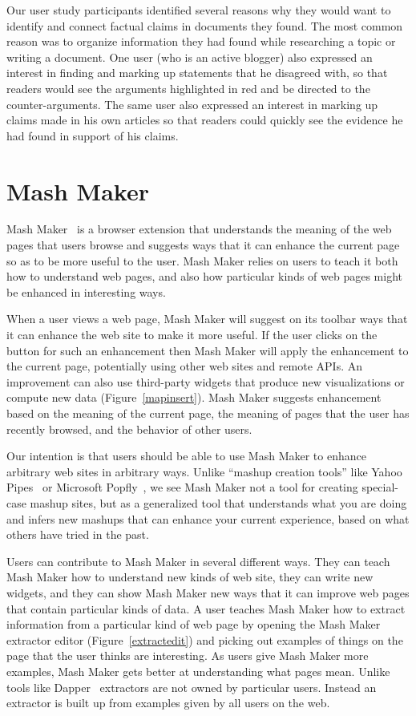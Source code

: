 \documentclass{chi2009}
\begin{document}
Our user study participants identified several reasons why they would want to identify and connect factual claims in documents they found. The most common reason was to organize information they had found while researching a topic or writing a document. One user (who is an active blogger) also expressed an interest in finding and marking up statements that he disagreed with, so that readers would see the arguments highlighted in red and be directed to the counter-arguments. The same user also expressed an interest in marking up claims made in his own articles so that readers could quickly see the evidence he had found in support of his claims. 


\section{Mash Maker}

Mash Maker~\cite{mashmaker} is a browser extension that understands the meaning of the web pages that users browse and suggests ways that it can enhance the current page so as to be more useful to the user. Mash Maker relies on users to teach it both how to understand web pages, and also how particular kinds of web pages might be enhanced in interesting ways.

When a user views a web page, Mash Maker will suggest on its toolbar ways that it can enhance the web site to make it more useful. If the user clicks on the button for such an enhancement then Mash Maker will apply the enhancement to the current page, potentially using other web sites and remote APIs. An improvement can also use third-party widgets that produce new visualizations or compute new data (Figure~\ref{mapinsert}). Mash Maker suggests enhancement based on the meaning of the current page, the meaning of pages that the user has recently browsed, and the behavior of other users.

Our intention is that users should be able to use Mash Maker to enhance arbitrary web sites in arbitrary ways. Unlike ``mashup creation tools'' like Yahoo Pipes~\cite{pipes} or Microsoft Popfly~\cite{popfly}, we see Mash Maker not a tool for creating special-case mashup sites, but as a generalized tool that understands what you are doing and infers new mashups that can enhance your current experience, based on what others have tried in the past. 

Users can contribute to Mash Maker in several different ways. They can teach Mash Maker how to understand new kinds of web site, they can write new widgets, and they can show Mash Maker new ways that it can improve web pages that contain particular kinds of data. A user teaches Mash Maker how to extract information from a particular kind of web page by opening the Mash Maker extractor editor (Figure~\ref{extractedit}) and picking out examples of things on the page that the user thinks are interesting. As users give Mash Maker more examples, Mash Maker gets better at understanding what pages mean. Unlike tools like Dapper~\cite{dapper} extractors are not owned by particular users. Instead an extractor is built up from examples given by all users on the web. 
\end{document}
